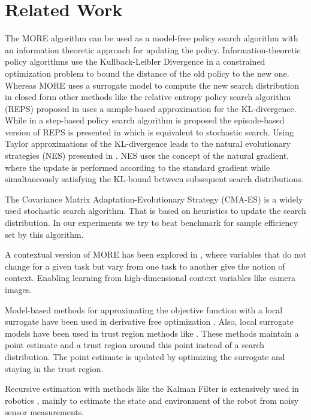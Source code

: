
\chapter{Related Work}
The MORE algorithm can be used as a model-free policy
search algorithm with an information theoretic approach for
updating the policy.
Information-theoretic policy algorithms use
the Kullback-Leibler Divergence in a constrained optimization problem
to bound the distance of the old policy to the new one.
Whereas MORE uses a surrogate model to compute the new search distribution
in closed form other methods like
the relative entropy policy search algorithm (REPS)
proposed in \citet{peters2010relative} uses a
sample-based approximation for the KL-divergence. While in
\citet{peters2010relative} a step-based policy search
algorithm is proposed the episode-based
version of REPS is presented in \citet{kupcsik2013data} which is equivalent
to stochastic search.
Using Taylor approximations of the KL-divergence leads to the
natural evolutionary strategies (NES)
presented in \citet{wierstra2014natural}. 
NES uses the concept of the natural gradient, where the update is performed
according to the standard gradient while simultaneously satisfying the
KL-bound between subsequent search distributions.

The Covariance Matrix Adaptation-Evolutionary Strategy (CMA-ES)
\citep{hansen2006cma}
is a widely used stochastic search algorithm. That is based on
heuristics to update the search distribution. In our experiments
we try to beat benchmark for sample efficiency set by this algorithm.

A contextual version of MORE has been
explored in \citet{tangkaratt2017policy}, where
variables that do not change for a given task
but vary from one task to another
give the notion of context. Enabling
learning from high-dimensional
context variables like camera images.

Model-based methods for approximating the objective function
with a local surrogate have been used in
derivative free optimization \citet{nocedal2006numerical}.
Also, local surrogate models have been used in trust region
methods like \citet{powell2009bobyqa}.
These methods maintain a point estimate
and a trust region around this point instead
of a search distribution. The point estimate is updated by optimizing
the surrogate and staying in the trust region.

Recursive estimation with methods like
the Kalman Filter is extensively used in robotics \citep{chen2011kalman},
mainly to estimate the state and environment of the robot
from noisy sensor measurements.

